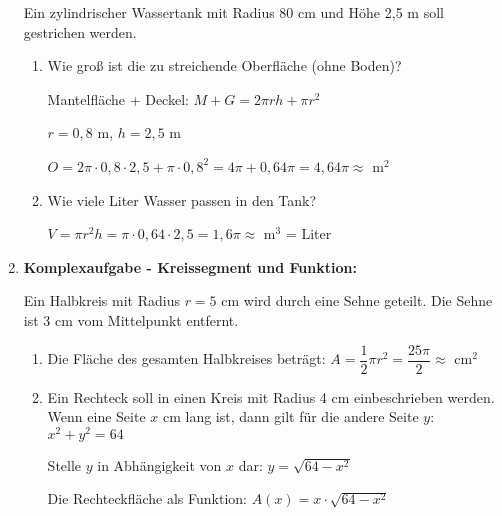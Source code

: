 \begin{enumerate}[label=\arabic*., resume]
    Ein zylindrischer Wassertank mit Radius 80 cm und Höhe 2{,}5 m soll gestrichen werden.

    \begin{enumerate}[label=\alph*)]
        \item Wie groß ist die zu streichende Oberfläche (ohne Boden)?

        Mantelfläche + Deckel: $M + G = 2\pi rh + \pi r^2$

        $r = 0{,}8$ m, $h = 2{,}5$ m

        $O = 2\pi \cdot 0{,}8 \cdot 2{,}5 + \pi \cdot 0{,}8^2 = 4\pi + 0{,}64\pi = 4{,}64\pi \approx$ \underline{\hspace{2cm}} m$^2$

        \vspace{0.3cm}
        \item Wie viele Liter Wasser passen in den Tank?

        $V = \pi r^2 h = \pi \cdot 0{,}64 \cdot 2{,}5 = 1{,}6\pi \approx$ \underline{\hspace{2cm}} m$^3$ = \underline{\hspace{2cm}} Liter
    \end{enumerate}

    \vspace{1cm}

    \item \textbf{Komplexaufgabe - Kreissegment und Funktion:}
    \vspace{0.5cm}

    Ein Halbkreis mit Radius $r = 5$ cm wird durch eine Sehne geteilt. Die Sehne ist 3 cm vom Mittelpunkt entfernt.

    \begin{enumerate}[label=\alph*)]
        \item Die Fläche des gesamten Halbkreises beträgt: $A = \dfrac{1}{2}\pi r^2 = \dfrac{25\pi}{2} \approx$ \underline{\hspace{2cm}} cm$^2$

        \vspace{0.3cm}
        \item Ein Rechteck soll in einen Kreis mit Radius 4 cm einbeschrieben werden. Wenn eine Seite $x$ cm lang ist, dann gilt für die andere Seite $y$: $x^2 + y^2 = 64$

        Stelle $y$ in Abhängigkeit von $x$ dar: $y = \sqrt{64 - x^2}$

        Die Rechteckfläche als Funktion: $A(x) = x \cdot \sqrt{64 - x^2}$


\end{enumerate}
\end{enumerate}
